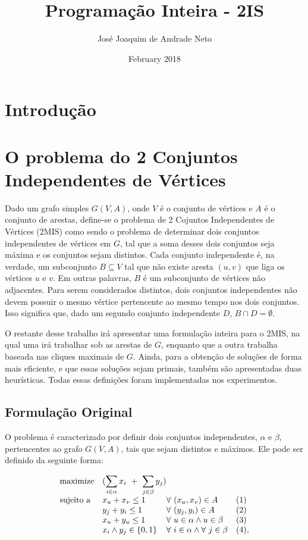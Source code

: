 \documentclass[12pt]{article}
\title{Programação Inteira - 2IS}
\author{José Joaquim de Andrade Neto}
\date{February 2018}
\begin{document}
\maketitle

\section{Introdução}

\section{O problema do 2 Conjuntos Independentes de Vértices}

Dado um grafo simples $G(V, A)$, onde $V$ é o conjunto de vértices e $A$ é o conjunto de arestas, define-se o problema de 2 Cojuntos Independentes de Vértices (2MIS) como sendo o problema de determinar dois conjuntos independentes de vértices em $G$, tal que a soma desses dois conjuntos seja máxima e os conjuntos sejam distintos.
Cada conjunto independente é, na verdade, um subconjunto $B \subseteq V$ tal que não existe aresta $(u, v)$ que liga os vértices $u$ e $v$. Em outras palavras, $B$ é um subconjunto de vértices não adjacentes. Para serem considerados distintos, dois conjuntos independentes não devem possuir o mesmo vértice pertencente ao mesmo tempo nos dois conjuntos. Isso significa que, dado um segundo conjunto independente $D$, $B \cap D = \emptyset$.

O restante desse trabalho irá apresentar uma formulação inteira para o 2MIS, na qual uma irá trabalhar sob as arestas de $G$, enquanto que a outra trabalha baseada nas cliques maximais de $G$. Ainda, para a obtenção de soluções de forma mais eficiente, e que essas soluções sejam primais, também são apresentadas duas heurísticas. Todas essas definições foram implementadas nos experimentos.  

\subsection{Formulação Original}

O problema é caracterizado por definir dois conjuntos independentes, $\alpha$ e $\beta$, pertencentes ao grafo $G(V, A)$, tais que sejam distintos e máximos. Ele pode ser definido da seguinte forma:

\begin{equation*}
\begin{array}{ll@{}ll}
\text{maximize}  & \displaystyle(\sum\limits_{i \in \alpha} x_{i}\ +\ \sum\limits_{j \in \beta}y_j)\\
\text{sujeito a }& \displaystyle x_u + x_v \leq 1 &\forall \ (x_u, x_v) \in A & (1) \\
                 & \displaystyle y_j + y_i \leq 1 &\forall \ (y_j, y_i) \in A & (2) \\
                 & \displaystyle x_u + y_u \leq 1 &\forall \ u \in \alpha \wedge u \in \beta & (3)\\
                 & \displaystyle x_i \wedge y_j \in \{0,1\} &\forall \ i \in \alpha \wedge \forall \ j \in \beta & (4),
\end{array}
\end{equation*}
\end{document}
